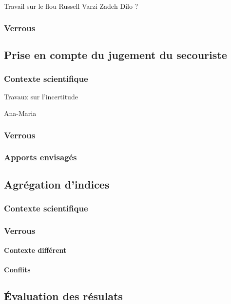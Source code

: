 Travail sur le flou
Russell
Varzi
Zadeh
Dilo ?


\subsubsection{Verrous}

\subsection{Prise en compte du jugement du secouriste}
\label{subsec:2-1-3}

\subsubsection{Contexte scientifique}

Travaux sur l'incertitude

Ana-Maria

\subsubsection{Verrous}

\subsubsection{Apports envisagés}

\subsection{Agrégation d'indices}
\label{subsec:2-1-4}

\subsubsection{Contexte scientifique}

\subsubsection{Verrous}

\paragraph{Contexte différent}

\paragraph{Conflits}

\subsection{Évaluation des résulats}
\label{subsec:2-1-5}


